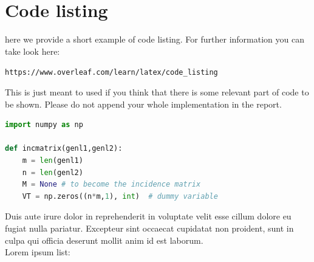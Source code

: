 \section{Code listing}

here we provide a short example of code listing. For further information you can take look here:

\texttt{https://www.overleaf.com/learn/latex/code\_listing}

This is just meant to used if you think that there is some relevant part of code to be shown. Please do not append your whole implementation in the report.
\begin{lstlisting}[language=Python]
import numpy as np

def incmatrix(genl1,genl2):
    m = len(genl1)
    n = len(genl2)
    M = None # to become the incidence matrix
    VT = np.zeros((n*m,1), int)  # dummy variable

\end{lstlisting}

\newpage

Duis aute irure dolor in reprehenderit in voluptate velit esse cillum dolore eu fugiat nulla pariatur. Excepteur sint occaecat cupidatat non proident, sunt in culpa qui officia deserunt mollit anim id est laborum. \\ Lorem ipsum list:

